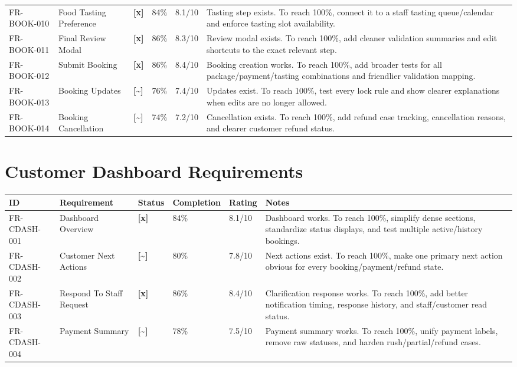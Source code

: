 \documentclass[11pt,a4paper]{article}
\newcommand{\statusdone}{\textbf{[x]}}
\newcommand{\statuspartial}{\textbf{[{\textasciitilde}]}}
\begin{document}
\begin{longtable}{L{0.15\textwidth} L{0.22\textwidth} C{0.08\textwidth} C{0.10\textwidth} C{0.10\textwidth} L{0.25\textwidth}}
FR-BOOK-010 & Food Tasting Preference & \statusdone & 84\% & 8.1/10 & Tasting step exists. To reach 100\%, connect it to a staff tasting queue/calendar and enforce tasting slot availability. \\
FR-BOOK-011 & Final Review Modal & \statusdone & 86\% & 8.3/10 & Review modal exists. To reach 100\%, add cleaner validation summaries and edit shortcuts to the exact relevant step. \\
FR-BOOK-012 & Submit Booking & \statusdone & 86\% & 8.4/10 & Booking creation works. To reach 100\%, add broader tests for all package/payment/tasting combinations and friendlier validation mapping. \\
FR-BOOK-013 & Booking Updates & \statuspartial & 76\% & 7.4/10 & Updates exist. To reach 100\%, test every lock rule and show clearer explanations when edits are no longer allowed. \\
FR-BOOK-014 & Booking Cancellation & \statuspartial & 74\% & 7.2/10 & Cancellation exists. To reach 100\%, add refund case tracking, cancellation reasons, and clearer customer refund status. \\
\bottomrule
\end{longtable}

\section{Customer Dashboard Requirements}

\begin{longtable}{L{0.15\textwidth} L{0.22\textwidth} C{0.08\textwidth} C{0.10\textwidth} C{0.10\textwidth} L{0.25\textwidth}}
\toprule
\textbf{ID} & \textbf{Requirement} & \textbf{Status} & \textbf{Completion} & \textbf{Rating} & \textbf{Notes} \\
\midrule
FR-CDASH-001 & Dashboard Overview & \statusdone & 84\% & 8.1/10 & Dashboard works. To reach 100\%, simplify dense sections, standardize status displays, and test multiple active/history bookings. \\
FR-CDASH-002 & Customer Next Actions & \statuspartial & 80\% & 7.8/10 & Next actions exist. To reach 100\%, make one primary next action obvious for every booking/payment/refund state. \\
FR-CDASH-003 & Respond To Staff Request & \statusdone & 86\% & 8.4/10 & Clarification response works. To reach 100\%, add better notification timing, response history, and staff/customer read status. \\
FR-CDASH-004 & Payment Summary & \statuspartial & 78\% & 7.5/10 & Payment summary works. To reach 100\%, unify payment labels, remove raw statuses, and harden rush/partial/refund cases. \\
\bottomrule
\end{longtable}
\end{document}
